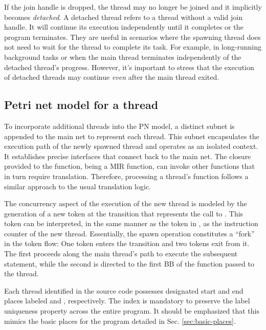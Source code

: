 If the join handle is dropped, the thread may no longer be joined and it implicitly becomes \emph{detached}.
A detached thread refers to a thread without a valid join handle.
It will continue its execution independently until it completes or the program terminates.
They are useful in scenarios where the spawning thread
does not need to wait for the thread to complete its task.
For example, in long-running background tasks or
when the main thread terminates independently of the detached thread's progress.
However, it's important to stress that
the execution of detached threads may continue \emph{even} after the main thread exited.

\subsection{Petri net model for a thread}

To incorporate additional threads into the \acrshort{PN} model,
a distinct subnet is appended to the main net to represent each thread.
This subnet encapsulates the execution path of the newly spawned thread
and operates as an isolated context.
It establishes precise interfaces that connect back to the main net.
The closure provided to the  function, being a MIR function,
can invoke other functions that in turn require translation.
Therefore, processing a thread's function follows
a similar approach to the usual translation logic.

The concurrency aspect of the execution of the new thread is modeled by the generation
of a new token at the transition that represents the call to .
This token can be interpreted, in the same manner as the token in ,
as the instruction counter of the new thread.
Essentially, the spawn operation constitutes a ``fork'' in the token flow:
One token enters the transition and two tokens exit from it.
The first proceeds along the main thread's path to execute the subsequent statement,
while the second is directed to the first \acrshort{BB} of the function passed to the thread.

Each thread identified in the source code possesses designated start and end places
labeled  and , respectively.
The index is mandatory to preserve the label uniqueness property across the entire program.
It should be emphasized that
this mimics the basic places for the program detailed in Sec. \ref{sec:basic-places}.

